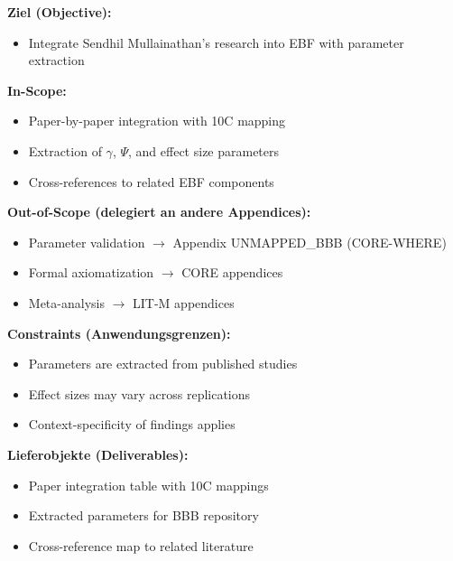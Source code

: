 
\begin{tcolorbox}[
    colback=orange!5!white,
    colframe=orange!75!black,
    title={\textbf{Appendix Scope: Ziel / In-Scope / Out-of-Scope / Constraints}},
    fonttitle=\bfseries
]

\textbf{Ziel (Objective):}
\begin{itemize}[nosep]
    \item Integrate Sendhil Mullainathan's research into EBF with parameter extraction
\end{itemize}

\textbf{In-Scope:}
\begin{itemize}[nosep]
    \item Paper-by-paper integration with 10C mapping
    \item Extraction of $\gamma$, $\Psi$, and effect size parameters
    \item Cross-references to related EBF components
\end{itemize}

\textbf{Out-of-Scope (delegiert an andere Appendices):}
\begin{itemize}[nosep]
    \item Parameter validation $\rightarrow$ Appendix UNMAPPED_BBB (CORE-WHERE)
    \item Formal axiomatization $\rightarrow$ CORE appendices
    \item Meta-analysis $\rightarrow$ LIT-M appendices
\end{itemize}

\textbf{Constraints (Anwendungsgrenzen):}
\begin{itemize}[nosep]
    \item Parameters are extracted from published studies
    \item Effect sizes may vary across replications
    \item Context-specificity of findings applies
\end{itemize}

\textbf{Lieferobjekte (Deliverables):}
\begin{itemize}[nosep]
    \item Paper integration table with 10C mappings
    \item Extracted parameters for BBB repository
    \item Cross-reference map to related literature
\end{itemize}

\end{tcolorbox}

